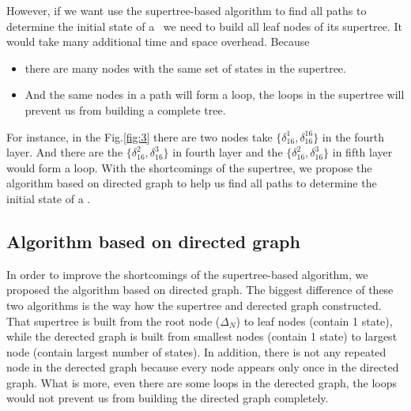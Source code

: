 However, if we want use the supertree-based algorithm to find all paths to determine the initial state of a \BCN\ we need to build all leaf nodes of its supertree. It would take many additional time and space overhead. Because 
\begin{itemize}
 \item there are many nodes with the same set of states in the supertree.
 \item And the same nodes in a path will form a loop, the loops in the supertree will prevent us from building a complete tree.
 \end{itemize}
For instance, in the Fig.\ref{fig:3} there are two nodes take $\{\delta_{16}^1,\delta_{16}^{16}\}$ in the fourth layer. And there are the $\{\delta_{16}^2,\delta_{16}^3\}$ in fourth layer and the $\{\delta_{16}^2,\delta_{16}^3\}$ in fifth layer would form a loop. With the shortcomings of the supertree, we propose the algorithm based on directed graph to help us find all paths to determine the initial state of a \BCN.
\subsection{Algorithm based on directed graph}
In order to improve the shortcomings of the supertree-based algorithm, we proposed the algorithm based on directed graph. The biggest difference of these two algorithms is the way how the  supertree and derected graph constructed. That supertree is built from the root node ($\Delta_N$) to leaf nodes (contain 1 state), while the derected graph is built from smallest nodes (contain 1 state) to largest node (contain largest number of states). In addition, there is not any repeated node in the derected graph because every node appears only once in the directed graph. What is more, even there are some loops in the derected graph, the loops would not prevent us from building the directed graph completely.

